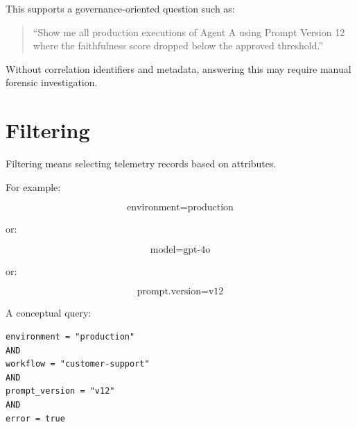 \documentclass[11pt,a4paper]{article}
\begin{document}
\begin{center}
\end{center}

This supports a governance-oriented question such as:

\begin{quote}
``Show me all production executions of Agent A using Prompt Version 12 where the faithfulness score dropped below the approved threshold.''
\end{quote}

Without correlation identifiers and metadata, answering this may require manual forensic investigation.

\section{Filtering}

Filtering means selecting telemetry records based on attributes.

For example:

\[
\text{environment} = \text{production}
\]

or:

\[
\text{model} = \text{gpt-4o}
\]

or:

\[
\text{prompt.version} = \text{v12}
\]

A conceptual query:

\begin{lstlisting}
environment = "production"
AND
workflow = "customer-support"
AND
prompt_version = "v12"
AND
error = true
\end{lstlisting}
\end{document}

